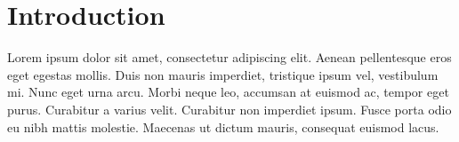 \documentclass[12pt]{article}
\begin{document}
\section{Introduction}
Lorem ipsum dolor sit amet, consectetur adipiscing elit. Aenean pellentesque eros eget egestas mollis. Duis non mauris imperdiet, tristique ipsum vel, vestibulum mi. Nunc eget urna arcu. Morbi neque leo, accumsan at euismod ac, tempor eget purus. Curabitur a varius velit. Curabitur non imperdiet ipsum. Fusce porta odio eu nibh mattis molestie. Maecenas ut dictum mauris, consequat euismod lacus.

\nocite{*}

\newpage

\printbibliography
\end{document}
